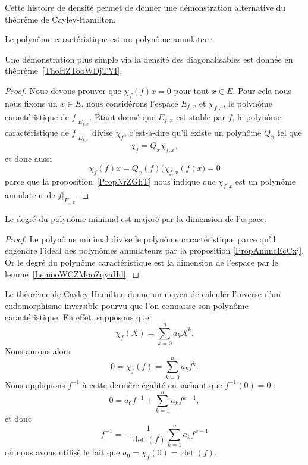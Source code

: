 Cette histoire de densité permet de donner une démonstration alternative du théorème de Cayley-Hamilton.
\begin{theorem}   \label{ThoCalYWLbJQ}
    Le polynôme caractéristique est un polynôme annulateur.
\end{theorem}

Une démonstration plus simple via la densité des diagonalisables est donnée en théorème~\ref{ThoHZTooWDjTYI}.
\begin{proof}
    Nous devons prouver que \( \chi_f(f)x=0\) pour tout \( x\in E\). Pour cela nous nous fixons un \( x\in E\), nous considérons l'espace \( E_{f,x}\) et \( \chi_{f,x}\), le polynôme caractéristique de \( f|_{E_{f,x}}\). Étant donné que \( E_{f,x}\) est stable par \( f\), le polynôme caractéristique de \( f|_{E_{f,x}}\) divise \( \chi_f\), c'est-à-dire qu'il existe un polynôme \( Q_x\) tel que
    \begin{equation}
        \chi_f=Q_x\chi_{f,x},
    \end{equation}
    et donc aussi
    \begin{equation}
        \chi_f(f)x=Q_x(f)\big( \chi_{f,x}(f)x \big)=0
    \end{equation}
    parce que la proposition~\ref{PropNrZGhT} nous indique que \( \chi_{f,x}\) est un polynôme annulateur de \( f|_{E_{f,x}}\).
\end{proof}

\begin{corollary}
    Le degré du polynôme minimal est majoré par la dimension de l'espace.
\end{corollary}

\begin{proof}
    Le polynôme minimal divise le polynôme caractéristique parce qu'il engendre l'idéal des polynômes annulateurs par la proposition \ref{PropAnnncEcCxj}. Or le degré du polynôme caractéristique est la dimension de l'espace par le lemme~\ref{LemooWCZMooZqyaHd}.
\end{proof}

\begin{example}
    Le théorème de Cayley-Hamilton donne un moyen de calculer l'inverse d'un endomorphisme inversible pourvu que l'on connaisse son polynôme caractéristique. En effet, supposons que
    \begin{equation}
        \chi_f(X)=\sum_{k=0}^na_kX^k.
    \end{equation}
    Nous aurons alors
    \begin{equation}
        0=\chi_f(f)=\sum_{k=0}^na_kf^k.
    \end{equation}
    Nous appliquons \( f^{-1}\) à cette dernière égalité en sachant que \( f^{-1}(0)=0\) :
    \begin{equation}
        0=a_0f^{-1}+\sum_{k=1}^na_kf^{k-1},
    \end{equation}
    et donc
    \begin{equation}
        f^{-1}=-\frac{1}{ \det(f) }\sum_{k=1}^na_kf^{k-1}
    \end{equation}
    où nous avons utilisé le fait que \( a_0=\chi_f(0)=\det(f)\).
\end{example}


